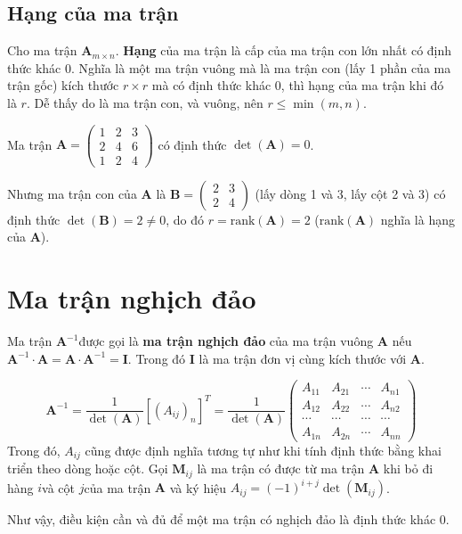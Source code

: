 \subsection*{Hạng của ma trận}

\begin{definition}
    Cho ma trận $\mathbf{A}_{m \times n}$. \textbf{Hạng} của ma trận là cấp của ma trận con lớn nhất có định thức khác 0. Nghĩa là một ma trận vuông mà là ma trận con (lấy 1 phần của ma trận gốc) kích thước $r \times r$ mà có định thức khác 0, thì hạng của ma trận khi đó là $r$. Dễ thấy do là ma trận con, và vuông, nên $r \leqslant \min(m, n)$.
\end{definition}

\begin{example}
    Ma trận $\bm{A} = \begin{pmatrix}
        1 & 2 & 3 \\ 2 & 4 & 6 \\ 1 & 2 & 4
    \end{pmatrix}$ có định thức $\det(\bm{A}) = 0$. 
    
    Nhưng ma trận con của $\bm{A}$ là $\bm{B} = \begin{pmatrix}2 & 3 \\ 2 & 4\end{pmatrix}$ (lấy dòng 1 và 3, lấy cột 2 và 3) có định thức $\det(\bm{B}) = 2 \neq 0$, do đó $r = \text{rank}(\bm{A}) = 2$ ($\text{rank}(\bm{A})$ nghĩa là hạng của $\bm{A}$).
\end{example}

\section{Ma trận nghịch đảo}

Ma trận $\bm{A}^{-1}$​ được gọi là \textbf{ma trận nghịch đảo} của ma trận vuông $\bm{A}$ nếu $\bm{A}^{-1} \cdot \bm{A} = \bm{A} \cdot \bm{A}^{-1} = \bm{I}$​. Trong đó $\bm{I}$ là ma trận đơn vị cùng kích thước với $\bm{A}$.

\begin{equation}
    \bm{A}^{-1}=\frac{1}{\det(\bm{A})}[(A_{ij})_n]^T=\frac{1}{\det(\bm{A})}\begin{pmatrix} A_{11} & A_{21} & \cdots & A_{n1} \\ A_{12} & A_{22} & \cdots & A_{n2} \\ \cdots & \cdots & \cdots & \cdots \\ A_{1n} & A_{2n} & \cdots & A_{nn} \end{pmatrix}
\end{equation}
Trong đó, $A_{ij}$ cũng được định nghĩa tương tự như khi tính định thức bằng khai triển theo dòng hoặc cột. Gọi $\bm{M}_{ij}$ là ma trận có được từ ma trận $\bm{A}$ khi bỏ đi hàng $i$​ và cột $j$​ của ma trận $\bm{A}$ và ký hiệu $A_{ij}=(-1)^{i+j} \det (\bm{M}_{ij})$.

Như vậy, điều kiện cần và đủ để một ma trận có nghịch đảo là định thức khác 0.